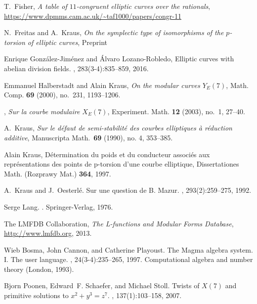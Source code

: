 \documentclass[12pt, reqno]{amsart}
\numberwithin{equation}{section}
\theoremstyle{definition}
\theoremstyle{remark}
\begin{document}
\begin{thebibliography}{999}
 T.\ Fisher,
{\em A table of $11$-congruent elliptic curves over the rationals}, \\
\url{https://www.dpmms.cam.ac.uk/~taf1000/papers/congr-11}

 N.\ Freitas and A.\ Kraus,
{\em On the symplectic type of isomorphisms of the $p$-torsion of elliptic curves}, Preprint

Enrique Gonz\'{a}lez-Jim\'{e}nez and \'{A}lvaro Lozano-Robledo,
\newblock Elliptic curves with abelian division fields.
, 283(3-4):835--859, 2016.

Emmanuel Halberstadt and Alain Kraus, \emph{On the modular curves {$Y_E(7)$}},
  Math. Comp. \textbf{69} (2000), no.~231, 1193--1206. 

\bysame, \emph{Sur la courbe modulaire {$X_E(7)$}}, Experiment. Math.
  {\bf 12} (2003), no.~1, 27--40. 
  
 A.\ Kraus,
{\em Sur le d\'efaut de semi-stabilit\'e des courbes elliptiques \`a r\'eduction additive},
Manuscripta Math.\ {\bf 69} (1990), no. 4, 353--385.
  
Alain Kraus,
\newblock D{\'e}termination du poids et du conducteur associ{\'e}s aux repr{\'e}sentations des points de p-torsion d'une courbe elliptique,
\newblock Dissertationes Math. (Rozprawy Mat.) {\bf 364}, 1997.

A.~Kraus and J.~Oesterl\'{e}.
\newblock Sur une question de {B}. {M}azur.
, 293(2):259--275, 1992.

Serge Lang.
.
\newblock Springer-Verlag, 1976.

 The {LMFDB Collaboration},
{\em The L-functions and Modular Forms Database}, \\
\url{http://www.lmfdb.org}, 2013.

Wieb Bosma, John Cannon, and Catherine Playoust.
\newblock The {M}agma algebra system. {I}. {T}he user language.
, 24(3-4):235--265, 1997.
\newblock Computational algebra and number theory (London, 1993).

Bjorn Poonen, Edward~F. Schaefer, and Michael Stoll.
\newblock Twists of {$X(7)$} and primitive solutions to {$x^2+y^3=z^7$}.
, 137(1):103--158, 2007.



\end{thebibliography}
\end{document}
